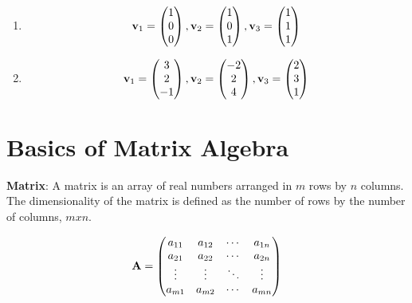\documentclass[]{book}
\theoremstyle{definition}
\theoremstyle{definition}
\theoremstyle{definition}
\theoremstyle{remark}
\begin{document}
\begin{enumerate}
        \item $${\bf v}_1 = \begin{pmatrix} 1 \\ 0 \\ 0 \end{pmatrix} , {\bf v}_2 = \begin{pmatrix} 1 \\ 0 \\ 1 \end{pmatrix} , {\bf v}_3 = \begin{pmatrix} 1 \\ 1 \\ 1 \end{pmatrix} $$ 
            \phantom{Yes}
        \item $${\bf v}_1 = \begin{pmatrix} 3 \\ 2 \\ -1 \end{pmatrix} , {\bf v}_2 = \begin{pmatrix} -2 \\ 2 \\ 4 \end{pmatrix} , {\bf v}_3 = \begin{pmatrix} 2 \\ 3 \\ 1 \end{pmatrix} $$ 
\end{enumerate}

\section{Basics of Matrix Algebra}\label{basics-of-matrix-algebra}

\textbf{Matrix}: A matrix is an array of real numbers arranged in \(m\)
rows by \(n\) columns. The dimensionality of the matrix is defined as
the number of rows by the number of columns, \(m x n\).

\[{\bf A}=\begin{pmatrix}
            a_{11} & a_{12} & \cdots & a_{1n} \\
            a_{21} & a_{22} & \cdots & a_{2n} \\
            \vdots & \vdots & \ddots & \vdots \\
            a_{m1} & a_{m2} & \cdots & a_{mn}
        \end{pmatrix}\]
\end{document}
